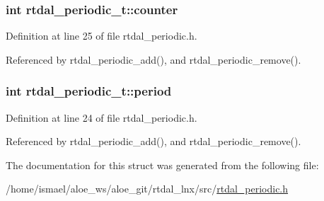 \hypertarget{structrtdal__periodic__t_aab5ee7319833ace02d2d350cc3af9d28}{
\subsubsection[{counter}]{\setlength{\rightskip}{0pt plus 5cm}int rtdal\-\_\-periodic\-\_\-t\-::counter}}\label{structrtdal__periodic__t_aab5ee7319833ace02d2d350cc3af9d28}


Definition at line 25 of file rtdal\-\_\-periodic.\-h.



Referenced by rtdal\-\_\-periodic\-\_\-add(), and rtdal\-\_\-periodic\-\_\-remove().

\hypertarget{structrtdal__periodic__t_afe8337bd8b7d4b0abc130f9dfb723bf2}{
\subsubsection[{period}]{\setlength{\rightskip}{0pt plus 5cm}int rtdal\-\_\-periodic\-\_\-t\-::period}}\label{structrtdal__periodic__t_afe8337bd8b7d4b0abc130f9dfb723bf2}


Definition at line 24 of file rtdal\-\_\-periodic.\-h.



Referenced by rtdal\-\_\-periodic\-\_\-add(), and rtdal\-\_\-periodic\-\_\-remove().



The documentation for this struct was generated from the following file\-:\begin{DoxyCompactItemize}
\item 
/home/ismael/aloe\-\_\-ws/aloe\-\_\-git/rtdal\-\_\-lnx/src/\hyperlink{rtdal__periodic_8h}{rtdal\-\_\-periodic.\-h}\end{DoxyCompactItemize}
